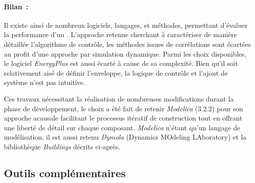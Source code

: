 \paragraph{Bilan~:} %
\label{par:bilan_logiciel}
Il existe ainsi de nombreux logiciels, langages, et méthodes, permettant d’évaluer la
performance d’un . L’approche retenue cherchant à caractériser de manière
détaillée l’algorithme de contrôle, les méthodes issues de corrélations sont écartées au
profit d’une approche par simulation dynamique. Parmi les choix disponibles, le logiciel
\textit{EnergyPlus} est aussi écarté à cause de sa complexité. Bien qu’il soit relativement aisé
de définir l’enveloppe, la logique de contrôle et l’ajout de système n’est pas intuitive.

Ces travaux nécessitant la réalisation de nombreuses modifications durant la phase de
développement, le choix a été fait de retenir \textit{Modelica} ($3.2.2$) pour son
approche acausale facilitant le processus itératif de construction tout en offrant une
liberté de détail sur chaque composant. \textit{Modelica} n’étant qu’un langage de
modélisation, il est aussi retenu \textit{Dymola} (Dynamics MOdeling LAboratory) et la
bibliothèque \textit{Buildings} décrits ci-après.



\subsection{Outils complémentaires} %
\label{sub:outils_complementaires}
